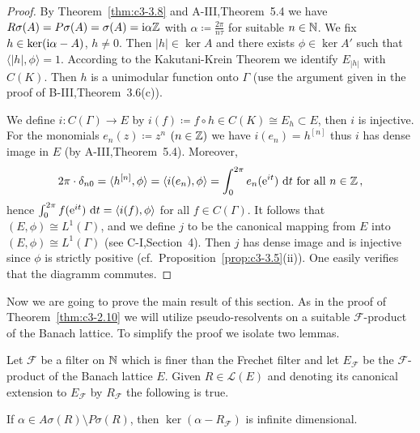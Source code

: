	\begin{proof}
		By Theorem~\ref{thm:c3-3.8} and A-III,Theorem~5.4 we have $R\sigma(A) = P\sigma(A) = \sigma(A) = \mathrm{i}\alpha\mathbb{Z}$ with $\alpha \coloneqq \frac{2\pi}{n\tau}$ for suitable $n \in \mathbb{N}$.
		We fix $h \in \ker(\mathrm{i}\alpha - A)$, $h \neq 0$.
		Then $|h| \in \ker A$ and there exists $\phi \in \ker A'$ such that $\langle|h|,\phi\rangle = 1$.
		According to the Kakutani-Krein Theorem we identify $E_{|h|}$ with $C(K)$.
		Then $h$ is a unimodular function onto $\Gamma$ (use the argument given in the proof of B-III,Theorem~3.6(c)).
		
		We define $i \colon C(\Gamma) \to E$ by $i(f) \coloneqq f\circ h \in C(K) \cong E_{h} \subset E$, then $i$ is injective.
		For the monomials $e_{n}(z) \coloneqq z^{n}$ $(n \in \mathbb{Z})$ we have $i(e_{n}) = h^{[n]}$ thus $i$ has dense image in $E$ (by A-III,Theorem~5.4).
		Moreover, 
		\[
		2\pi\cdot\delta_{n0} = \langle h^{[n]},\phi\rangle = \langle i(e_{n}),\phi\rangle = \int_{0}^{2\pi} e_{n}(\mathrm{e}^{it})\,\mathop{}\!\mathrm{d}{t} \text{ for all } n \in \mathbb{Z}\,,
		\] 
		hence $\int_{0}^{2\pi} f(\mathrm{e}^{it})\,\mathop{}\!\mathrm{d}{t}  = \langle i(f),\phi\rangle$ for all $f \in C(\Gamma)$.
		It follows that $(E,\phi) \cong L^{1}(\Gamma)$, and we define $j$ to be the canonical mapping from $E$ into $(E,\phi) \cong L^{1}(\Gamma)$ (see C-I,Section~4).
		Then $j$ has dense image and is injective since $\phi$ is strictly positive (cf.\ Proposition~\ref{prop:c3-3.5}(ii)).
		One easily verifies that the diagramm commutes.
	\end{proof}
%
%
Now we are going to prove the main result of this section.
As in the proof of Theorem~\ref{thm:c3-2.10} we will utilize pseudo-resolvents on a suitable $\mathcal{F}$-product of the Banach lattice.
To simplify the proof we isolate two lemmas.

\begin{lemma}\label{lem:c3-3.10}
	
	Let $\mathcal{F}$ be a filter on $\mathbb{N}$ which is finer than the Frechet filter and let $E_{\mathcal{F}}$ be the $\mathcal{F}$-product of the Banach lattice $E$.
	Given $R \in \mathcal{L}(E)$ and denoting its canonical extension to $E_{\mathcal{F}}$ by $R_{\mathcal{F}}$ the following is true.
	
	If $\alpha \in A\sigma(R)\setminus P\sigma(R)$, then $\ker(\alpha - R_{\mathcal{F}})$ is infinite dimensional.
\end{lemma}
	
